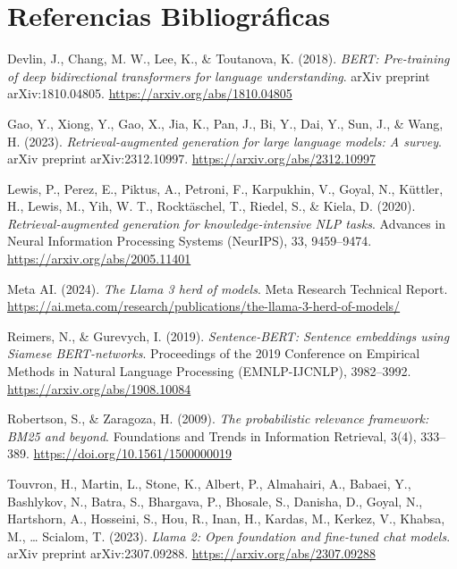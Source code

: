 \documentclass[12pt,letterpaper]{article}
\begin{document}
\newpage
\section{Referencias Bibliográficas}

\begin{singlespace}
\begin{description}
    \item Devlin, J., Chang, M. W., Lee, K., \& Toutanova, K. (2018). \textit{BERT: Pre-training of deep bidirectional transformers for language understanding}. arXiv preprint arXiv:1810.04805. \url{https://arxiv.org/abs/1810.04805}
    
    \item Gao, Y., Xiong, Y., Gao, X., Jia, K., Pan, J., Bi, Y., Dai, Y., Sun, J., \& Wang, H. (2023). \textit{Retrieval-augmented generation for large language models: A survey}. arXiv preprint arXiv:2312.10997. \url{https://arxiv.org/abs/2312.10997}
    
    \item Lewis, P., Perez, E., Piktus, A., Petroni, F., Karpukhin, V., Goyal, N., Küttler, H., Lewis, M., Yih, W. T., Rocktäschel, T., Riedel, S., \& Kiela, D. (2020). \textit{Retrieval-augmented generation for knowledge-intensive NLP tasks}. Advances in Neural Information Processing Systems (NeurIPS), 33, 9459--9474. \url{https://arxiv.org/abs/2005.11401}
    
    \item Meta AI. (2024). \textit{The Llama 3 herd of models}. Meta Research Technical Report. \url{https://ai.meta.com/research/publications/the-llama-3-herd-of-models/}
    
    \item Reimers, N., \& Gurevych, I. (2019). \textit{Sentence-BERT: Sentence embeddings using Siamese BERT-networks}. Proceedings of the 2019 Conference on Empirical Methods in Natural Language Processing (EMNLP-IJCNLP), 3982--3992. \url{https://arxiv.org/abs/1908.10084}
    
    \item Robertson, S., \& Zaragoza, H. (2009). \textit{The probabilistic relevance framework: BM25 and beyond}. Foundations and Trends in Information Retrieval, 3(4), 333--389. \url{https://doi.org/10.1561/1500000019}
    
    \item Touvron, H., Martin, L., Stone, K., Albert, P., Almahairi, A., Babaei, Y., Bashlykov, N., Batra, S., Bhargava, P., Bhosale, S., Danisha, D., Goyal, N., Hartshorn, A., Hosseini, S., Hou, R., Inan, H., Kardas, M., Kerkez, V., Khabsa, M., \dots{} Scialom, T. (2023). \textit{Llama 2: Open foundation and fine-tuned chat models}. arXiv preprint arXiv:2307.09288. \url{https://arxiv.org/abs/2307.09288}
\end{description}
\end{singlespace}
\end{document}
